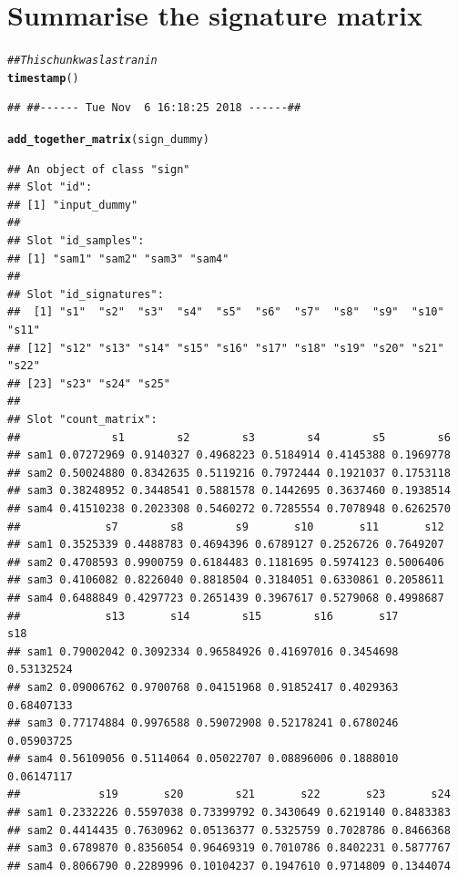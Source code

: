 \documentclass{article}\usepackage[]{graphicx}\usepackage[]{color}
\makeatletter
\newcommand{\hlcom}[1]{\textcolor[rgb]{0.678,0.584,0.686}{\textit{#1}}}%
\newcommand{\hlstd}[1]{\textcolor[rgb]{0.345,0.345,0.345}{#1}}%
\newcommand{\hlkwd}[1]{\textcolor[rgb]{0.737,0.353,0.396}{\textbf{#1}}}%
\newenvironment{kframe}{%
 \def\at@end@of@kframe{}%
 \ifinner\ifhmode%
  \def\at@end@of@kframe{\end{minipage}}%
  \begin{minipage}{\columnwidth}%
 \fi\fi%
 \def\FrameCommand##1{\hskip\@totalleftmargin \hskip-\fboxsep
 \colorbox{shadecolor}{##1}\hskip-\fboxsep
     \hskip-\linewidth \hskip-\@totalleftmargin \hskip\columnwidth}%
 \MakeFramed {\advance\hsize-\width
   \@totalleftmargin\z@ \linewidth\hsize
   \@setminipage}}%
 {\par\unskip\endMakeFramed%
 \at@end@of@kframe}
\newenvironment{knitrout}{}{} %
\makeatother
\begin{document}
\section{Summarise the signature matrix}
\begin{knitrout}
\color{fgcolor}\begin{kframe}
\begin{alltt}
\hlcom{## This chunk was last ran in}
\hlkwd{timestamp}\hlstd{()}
\end{alltt}
\begin{verbatim}
## ##------ Tue Nov  6 16:18:25 2018 ------##
\end{verbatim}
\begin{alltt}
\hlkwd{add_together_matrix}\hlstd{(sign_dummy)}
\end{alltt}
\begin{verbatim}
## An object of class "sign"
## Slot "id":
## [1] "input_dummy"
## 
## Slot "id_samples":
## [1] "sam1" "sam2" "sam3" "sam4"
## 
## Slot "id_signatures":
##  [1] "s1"  "s2"  "s3"  "s4"  "s5"  "s6"  "s7"  "s8"  "s9"  "s10" "s11"
## [12] "s12" "s13" "s14" "s15" "s16" "s17" "s18" "s19" "s20" "s21" "s22"
## [23] "s23" "s24" "s25"
## 
## Slot "count_matrix":
##              s1        s2        s3        s4        s5        s6
## sam1 0.07272969 0.9140327 0.4968223 0.5184914 0.4145388 0.1969778
## sam2 0.50024880 0.8342635 0.5119216 0.7972444 0.1921037 0.1753118
## sam3 0.38248952 0.3448541 0.5881578 0.1442695 0.3637460 0.1938514
## sam4 0.41510238 0.2023308 0.5460272 0.7285554 0.7078948 0.6262570
##             s7        s8        s9       s10       s11       s12
## sam1 0.3525339 0.4488783 0.4694396 0.6789127 0.2526726 0.7649207
## sam2 0.4708593 0.9900759 0.6184483 0.1181695 0.5974123 0.5006406
## sam3 0.4106082 0.8226040 0.8818504 0.3184051 0.6330861 0.2058611
## sam4 0.6488849 0.4297723 0.2651439 0.3967617 0.5279068 0.4998687
##             s13       s14        s15        s16       s17        s18
## sam1 0.79002042 0.3092334 0.96584926 0.41697016 0.3454698 0.53132524
## sam2 0.09006762 0.9700768 0.04151968 0.91852417 0.4029363 0.68407133
## sam3 0.77174884 0.9976588 0.59072908 0.52178241 0.6780246 0.05903725
## sam4 0.56109056 0.5114064 0.05022707 0.08896006 0.1888010 0.06147117
##            s19       s20        s21       s22       s23       s24
## sam1 0.2332226 0.5597038 0.73399792 0.3430649 0.6219140 0.8483383
## sam2 0.4414435 0.7630962 0.05136377 0.5325759 0.7028786 0.8466368
## sam3 0.6789870 0.8356054 0.96469319 0.7010786 0.8402231 0.5877767
## sam4 0.8066790 0.2289996 0.10104237 0.1947610 0.9714809 0.1344074

\end{verbatim}
\end{kframe}
\end{knitrout}
\end{document}
